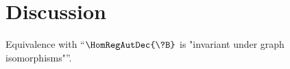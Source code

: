 \section{\AP\label{sec:dichotomy-discussion}%
	Discussion}

Equivalence with ``$\HomRegAutDec{\?B}$ is "invariant under graph isomorphisms"''.
